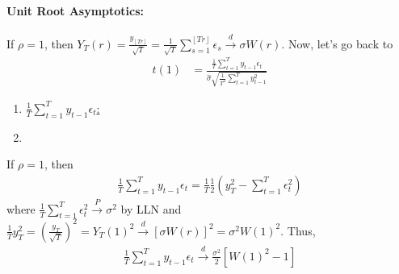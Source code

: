 \documentclass[11pt]{elegantbook}
\begin{document}
\paragraph*{Unit Root Asymptotics:} If $\rho=1$, then $Y_T(r)=\frac{y_{\left\lfloor Tr\right\rfloor}}{\sqrt{T}}=\frac{1}{\sqrt{T}}\sum_{s=1}^{\left\lfloor Tr\right\rfloor}\epsilon_s \stackrel{d}{\longrightarrow} \sigma W(r)$. Now, let's go back to
\begin{equation}
    \begin{aligned}
        t(1)&=\frac{\frac{1}{T}\sum_{t=1}^Ty_{t-1}\epsilon_t}{\hat{\sigma}\sqrt{\frac{1}{T^2}\sum_{t=1}^Ty_{t-1}^2}}
    \end{aligned}
    \nonumber
\end{equation}
\begin{enumerate}
    \item \underline{$\frac{1}{T}\sum_{t=1}^Ty_{t-1}\epsilon_t$:}
    \item 
\end{enumerate}
If $\rho=1$, then
\begin{equation}
    \begin{aligned}
        \frac{1}{T}\sum_{t=1}^T y_{t-1}\epsilon_t=\frac{1}{T}\frac{1}{2}\left(y_T^2-\sum_{t=1}^T\epsilon_t^2\right)
    \end{aligned}
    \nonumber
\end{equation}
where $\frac{1}{T}\sum_{t=1}^T\epsilon_t^2 \stackrel{P}{\longrightarrow} \sigma^2$ by LLN and $\frac{1}{T}y_T^2=\left(\frac{y_T}{\sqrt{T}}\right)^2=Y_T(1)^2\stackrel{d}{\longrightarrow} [\sigma W(r)]^2=\sigma^2W(1)^2$. Thus,
\begin{equation}
    \begin{aligned}
        \frac{1}{T}\sum_{t=1}^T y_{t-1}\epsilon_t \stackrel{d}{\longrightarrow} \frac{\sigma^2}{2}\left[W(1)^2-1\right]
    \end{aligned}
    \nonumber
\end{equation}












\appendix

\end{document}
